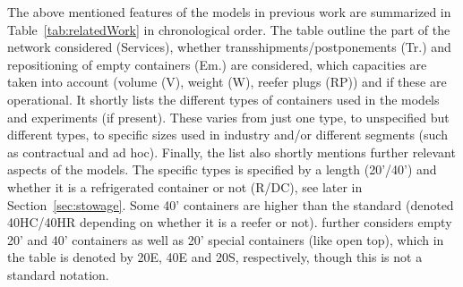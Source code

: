 The above mentioned features of the models in previous work are summarized in Table~\ref{tab:relatedWork} in chronological order. The table outline the part of the network considered (Services), whether transshipments/postponements (Tr.) and repositioning of empty containers (Em.) are considered, which capacities are taken into account (volume (V), weight (W), reefer plugs (RP)) and if these are operational. It shortly lists the different types of containers used in the models and experiments (if present). These varies from just one type, to unspecified but different types, to specific sizes used in industry and/or different segments (such as contractual and ad hoc).  Finally, the list also shortly mentions further relevant aspects of the models.
The specific types is specified by a length (20'/40') and whether it is a refrigerated container or not (R/DC), see later in Section~\ref{sec:stowage}. Some 40' containers are higher than the standard (denoted 40HC/40HR depending on whether it is a reefer or not). \cite{Lu10} further considers empty 20' and 40' containers as well as 20' special containers (like open top), which in the table is denoted by 20E, 40E and 20S, respectively, though this is not a standard notation.   
